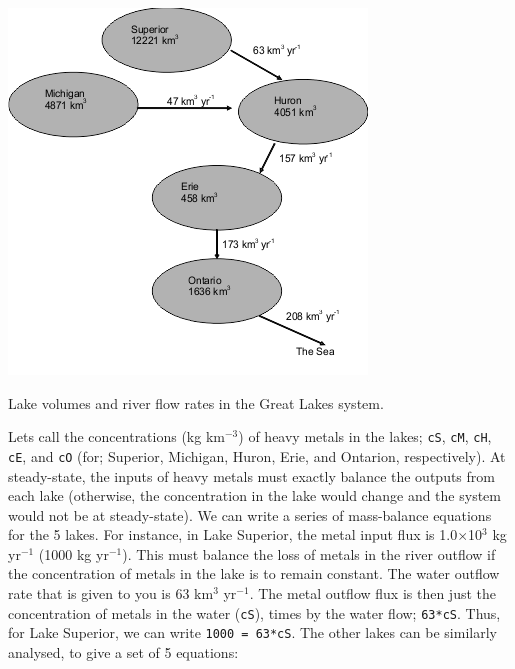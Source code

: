 \documentclass{tufte-book} %
\begin{document}
\begin{marginfigure}[0.0in]
\includegraphics[width=\linewidth]{ch4-lakes_schematic.tif}
\caption{Lake volumes and river flow rates in the Great Lakes system.}
\label{fig:ch4-lakes_schematic}
\end{marginfigure}

Lets call the concentrations (kg km\(^{-3}\)) of heavy metals in the lakes; \texttt{cS}, \texttt{cM}, \texttt{cH}, \texttt{cE}, and \texttt{cO} (for; Superior, Michigan, Huron, Erie, and Ontarion, respectively). At steady-state, the inputs of heavy metals must exactly balance the outputs from each lake (otherwise, the concentration in the lake would change and the system would not be at steady-state). We can write a series of mass-balance equations for the 5 lakes. For instance, in Lake Superior, the metal input flux is 1.0\(\times\)10\(^{3}\) kg yr\(^{-1}\) (1000 kg yr\(^{-1}\)). This must balance the loss of metals in the river outflow if the concentration of metals in the lake is to remain constant. The water outflow rate that is given to you is 63 km\(^{3}\) yr\(^{-1}\). The metal outflow flux is then just the concentration of metals in the water (\texttt{cS}), times by the water flow; \texttt{63*cS}. Thus, for Lake Superior, we can write \texttt{1000 = 63*cS}. The other lakes can be similarly analysed, to give a set of 5 equations:
\end{document}
